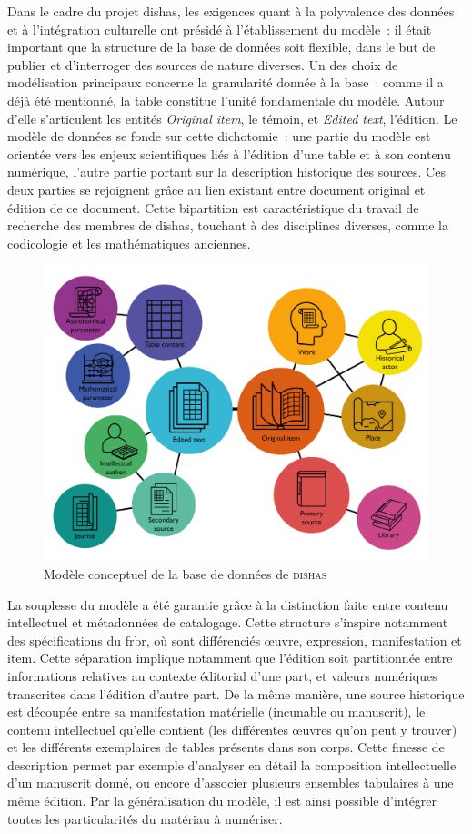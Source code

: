 \documentclass[a4paper,12pt,twoside]{book}
\newcommand{\eng}{\emph}
\newcommand{\Oi}{\eng{Original item}\xspace}
\newcommand{\dishas}{\gls{dishas}\xspace}
\newcommand{\frbr}{\gls{frbr}\xspace}
\begin{document}
Dans le cadre du projet \dishas, les exigences quant à la polyvalence des données et à l'intégration culturelle ont présidé à l'établissement du modèle~: il était important que la structure de la base de données soit flexible, dans le but de publier et d'interroger des sources de nature diverses. Un des choix de modélisation principaux concerne la granularité donnée à la base~: comme il a déjà été mentionné, la table constitue l'unité fondamentale du modèle. Autour d'elle s'articulent les entités \Oi, le témoin, et \eng{Edited text}, l'édition. Le modèle de données se fonde sur cette dichotomie~: une partie du modèle est orientée vers les enjeux scientifiques liés à l'édition d'une table et à son contenu numérique, l'autre partie portant sur la description historique des sources. Ces deux parties se rejoignent grâce au lien existant entre document original et édition de ce document. Cette bipartition est caractéristique du travail de recherche des membres de \dishas, touchant à des disciplines diverses, comme la codicologie et les mathématiques anciennes.

\begin{figure}[h!]
	\centering
	\includegraphics[width=12cm]{Images/Modele-de-donnees.png}
	\caption{\label{Modelisation}Modèle conceptuel de la base de données de \textsc{dishas}}
\end{figure}

La souplesse du modèle a été garantie grâce à la distinction faite entre contenu intellectuel et métadonnées de catalogage. Cette structure s'inspire notamment des spécifications du \frbr, où sont différenciés œuvre, expression, manifestation et item. Cette séparation implique notamment que l'édition soit partitionnée entre informations relatives au contexte éditorial d'une part, et valeurs numériques transcrites dans l'édition d'autre part. De la même manière, une source historique est découpée entre sa manifestation matérielle (incunable ou manuscrit), le contenu intellectuel qu'elle contient (les différentes œuvres qu'on peut y trouver) et les différents exemplaires de tables présents dans son corps. Cette finesse de description permet par exemple d'analyser en détail la composition intellectuelle d'un manuscrit donné, ou encore d'associer plusieurs ensembles tabulaires à une même édition. Par la généralisation du modèle, il est ainsi possible d'intégrer toutes les particularités du matériau à numériser.
\end{document}
